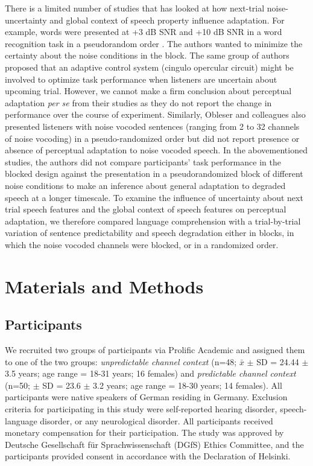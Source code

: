 \documentclass[a4paper, nobind]{templates/ociamthesis}
\begin{document}
There is a limited number of studies that has looked at how next-trial noise-uncertainty and global context of speech property influence adaptation.
For example, words were presented at +3 dB SNR and +10 dB SNR in a word recognition task in a pseudorandom order \autocite{Vaden2013}.
The authors wanted to minimize the certainty about the noise conditions in the block.
The same group of authors \autocite{Vaden2015a,Vaden2015b,Eckert2016} proposed that an adaptive control system (cingulo opercular circuit) might be involved to optimize task performance when listeners are uncertain about upcoming trial.
However, we cannot make a firm conclusion about perceptual adaptation \emph{per se} from their studies as they do not report the change in performance over the course of experiment.
Similarly, Obleser and colleagues \autocite{Obleser2007,Obleser2011,Hartwigsen2015} also presented listeners with noise vocoded sentences (ranging from 2 to 32 channels of noise vocoding) in a pseudo-randomized order but did not report presence or absence of perceptual adaptation to noise vocoded speech.
In the abovementioned studies, the authors did not compare participants' task performance in the blocked design against the presentation in a pseudorandomized block of different noise conditions to make an inference about general adaptation to degraded speech at a longer timescale.
To examine the influence of uncertainty about next trial speech features and the global context of speech features on perceptual adaptation, we therefore compared language comprehension with a trial-by-trial variation of sentence predictability and speech degradation either in blocks, in which the noise vocoded channels were blocked, or in a randomized order.

\hypertarget{materials-and-methods-2}{%
\section{Materials and Methods}\label{materials-and-methods-2}}

\hypertarget{participants-2}{%
\subsection{Participants}\label{participants-2}}

We recruited two groups of participants via Prolific Academic and assigned them to one of the two groups:
\emph{unpredictable channel context} (n=48; \(\bar{x}\) \(\pm\) SD = 24.44 \(\pm\) 3.5 years; age range = 18-31 years; 16 females) and \emph{predictable channel context} (n=50; \(\pm\) SD = 23.6 \(\pm\) 3.2 years; age range = 18-30 years; 14 females).
All participants were native speakers of German residing in Germany.
Exclusion criteria for participating in this study were self-reported hearing disorder, speech-language disorder, or any neurological disorder.
All participants received monetary compensation for their participation.
The study was approved by Deutsche Gesellschaft für Sprachwissenschaft (DGfS) Ethics Committee, and the participants provided consent in accordance with the Declaration of Helsinki.
\end{document}
